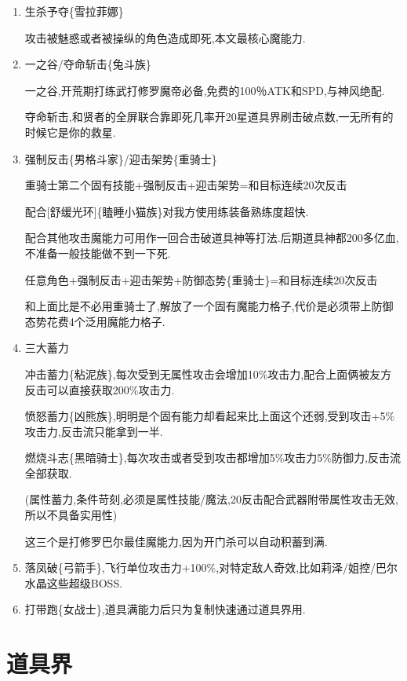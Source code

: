 	\begin{enumerate}
		\item
		生杀予夺\{雪拉菲娜\}

		攻击被魅惑或者被操纵的角色造成即死,本文最核心魔能力.

		\item
		一之谷/夺命斩击\{兔斗族\}

		一之谷,开荒期打练武打修罗魔帝必备,免费的100％ATK和SPD,与神风绝配.

		夺命斩击,和贤者的全屏联合靠即死几率开20星道具界刷击破点数,一无所有的时候它是你的救星.

		\item
		强制反击\{男格斗家\}/迎击架势\{重骑士\}

		重骑士第二个固有技能+强制反击+迎击架势=和目标连续20次反击

		配合[舒缓光环]\{瞌睡小猫族\}对我方使用练装备熟练度超快.

		配合其他攻击魔能力可用作一回合击破道具神等打法.后期道具神都200多亿血,不准备一般技能做不到一下死.

		任意角色+强制反击+迎击架势+防御态势\{重骑士\}=和目标连续20次反击

		和上面比是不必用重骑士了,解放了一个固有魔能力格子,代价是必须带上防御态势花费4个泛用魔能力格子.

		\item
		三大蓄力

		冲击蓄力\{粘泥族\},每次受到无属性攻击会增加10\%攻击力,配合上面俩被友方反击可以直接获取200\%攻击力.

		愤怒蓄力\{凶熊族\},明明是个固有能力却看起来比上面这个还弱,受到攻击+5\%攻击力,反击流只能拿到一半.

		燃烧斗志\{黑暗骑士\},每次攻击或者受到攻击都增加5\%攻击力5\%防御力,反击流全部获取.

		(属性蓄力,条件苛刻,必须是属性技能/魔法,20反击配合武器附带属性攻击无效,所以不具备实用性)

		这三个是打修罗巴尔最佳魔能力,因为开门杀可以自动积蓄到满.

		\item
		落凤破\{弓箭手\},飞行单位攻击力+100\%,对特定敌人奇效,比如莉泽/姐控/巴尔水晶这些超级BOSS.

		\item
		打带跑\{女战士\},道具满能力后只为复制快速通过道具界用.

	\end{enumerate}
	
	\newpage

	\section{道具界}

